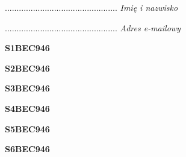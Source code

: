 \begin{turn}{90}\begin{minipage}{\linewidth} \vspace{20mm} ................................................  \textit{Imię i nazwisko}\end{minipage}\end{turn}

\begin{turn}{90}\begin{minipage}{\linewidth} \vspace{20mm} ................................................  \textit{Adres e-mailowy}\end{minipage}\end{turn}

\begin{turn}{90}\huge \begin{minipage}{\linewidth} \vspace{10mm}\textbf{S1BEC946}\end{minipage}\end{turn}

\begin{turn}{90}\huge \begin{minipage}{\linewidth} \vspace{10mm}\textbf{S2BEC946}\end{minipage}\end{turn}

\begin{turn}{90}\huge \begin{minipage}{\linewidth} \vspace{10mm}\textbf{S3BEC946}\end{minipage}\end{turn}

\begin{turn}{90}\huge \begin{minipage}{\linewidth} \vspace{10mm}\textbf{S4BEC946}\end{minipage}\end{turn}

\begin{turn}{90}\huge \begin{minipage}{\linewidth} \vspace{10mm}\textbf{S5BEC946}\end{minipage}\end{turn}

\begin{turn}{90}\huge \begin{minipage}{\linewidth} \vspace{10mm}\textbf{S6BEC946}\end{minipage}\end{turn}

